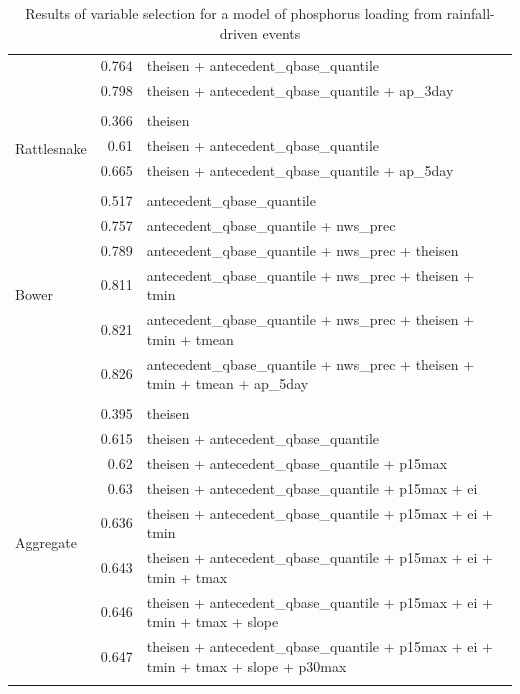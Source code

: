 \documentclass[10pt]{article}
\begin{document}
\begin{table}[h]
\begin{center}
\begin{tabular}{lrl}
 & 0.764 & theisen + antecedent\_qbase\_quantile\\ 
 & 0.798 & theisen + antecedent\_qbase\_quantile + ap\_3day\\ 
\vspace{2mm}\\ \multirow{4}{*}{Rattlesnake} & 0.366 & theisen\\ 
 & 0.61 & theisen + antecedent\_qbase\_quantile\\ 
 & 0.665 & theisen + antecedent\_qbase\_quantile + ap\_5day\\ 
\vspace{2mm}\\ \multirow{7}{*}{Bower} & 0.517 & antecedent\_qbase\_quantile\\ 
 & 0.757 & antecedent\_qbase\_quantile + nws\_prec\\ 
 & 0.789 & antecedent\_qbase\_quantile + nws\_prec + theisen\\ 
 & 0.811 & antecedent\_qbase\_quantile + nws\_prec + theisen + tmin\\ 
 & 0.821 & antecedent\_qbase\_quantile + nws\_prec + theisen + tmin + tmean\\ 
 & 0.826 & antecedent\_qbase\_quantile + nws\_prec + theisen + tmin + tmean + ap\_5day\\ 
\vspace{2mm}\\ \multirow{9}{*}{Aggregate} & 0.395 & theisen\\ 
 & 0.615 & theisen + antecedent\_qbase\_quantile\\ 
 & 0.62 & theisen + antecedent\_qbase\_quantile + p15max\\ 
 & 0.63 & theisen + antecedent\_qbase\_quantile + p15max + ei\\ 
 & 0.636 & theisen + antecedent\_qbase\_quantile + p15max + ei + tmin\\ 
 & 0.643 & theisen + antecedent\_qbase\_quantile + p15max + ei + tmin + tmax\\ 
 & 0.646 & theisen + antecedent\_qbase\_quantile + p15max + ei + tmin + tmax + slope\\ 
 & 0.647 & theisen + antecedent\_qbase\_quantile + p15max + ei + tmin + tmax + slope + p30max\\ 
\vspace{2mm}\\     \end{tabular}
    \caption{Results of variable selection for a model of phosphorus loading from rainfall-driven events\label{phos_r_square_nosnow}}
    \end{center}
\end{table}
\end{document}
